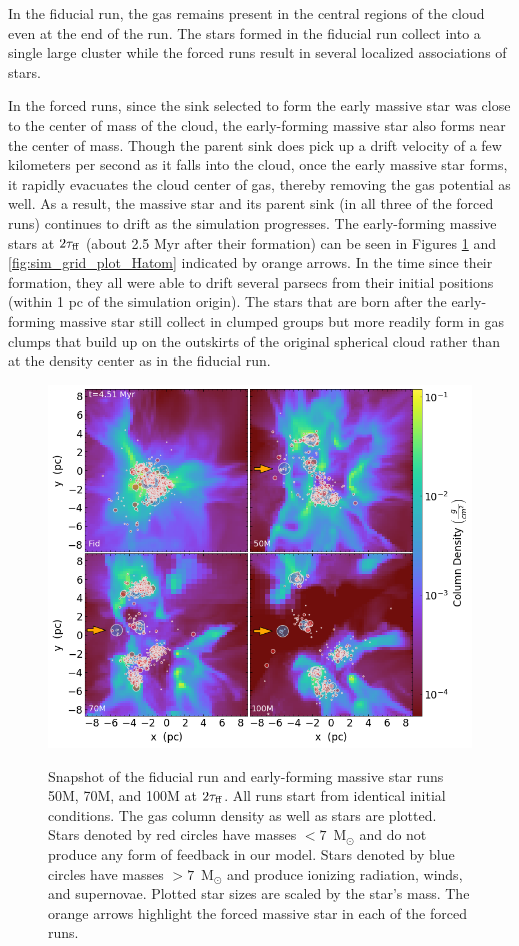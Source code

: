 \documentclass[twoside]{drexel-thesis}
\begin{document}
\begin{thesis}
In the fiducial run, the gas remains present in the central regions of the cloud even at the end of the run. 
The stars formed in the fiducial run collect into a single large cluster while the forced runs result in several localized associations of stars. 

In the forced runs, since the sink selected to form the early massive star was close to the center of mass of the cloud, the early-forming massive star also forms near the center of mass. Though the parent sink does pick up a drift velocity of a few kilometers per second as it falls into the cloud, once the early massive star forms, it rapidly evacuates the cloud center of gas, thereby removing the gas potential as well. As a result, the massive star and its parent sink (in all three of the forced runs) continues to drift as the simulation progresses. The early-forming massive stars at $2\tau_{\rm ff}$ (about 2.5 Myr after their formation) can be seen in Figures \ref{fig:sim_grid_plot} and \ref{fig:sim_grid_plot_Hatom} indicated by orange arrows. In the time since their formation, they all were able to drift several parsecs from their initial positions (within 1 pc of the simulation origin). The stars that are born after the early-forming massive star still collect in clumped groups but more readily form in gas clumps that build up on the outskirts of the original spherical cloud rather than at the density center as in the fiducial run.

\begin{figure}[!htb]
    \centering
	\includegraphics[width=0.8\linewidth]{all_run_density_grid_092722.png}\\
    \caption{Snapshot of the fiducial run and early-forming massive star runs 50M, 70M, and 100M at $2\tau_{\rm ff}$. All runs start from identical initial conditions. The gas column density as well as stars are plotted. Stars denoted by red circles have masses $<7$~M$_\odot$ and do not produce any form of feedback in our model. Stars denoted by blue circles have masses $>7$~M$_\odot$ and produce ionizing radiation, winds, and supernovae. Plotted star sizes are scaled by the star's mass. The orange arrows highlight the forced massive star in each of the forced runs. }
    \label{fig:sim_grid_plot}
\end{figure}


\end{thesis}
\end{document}
